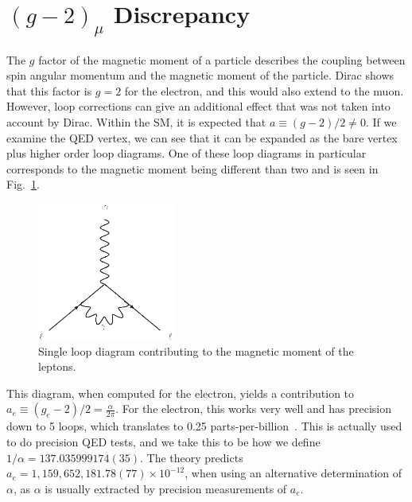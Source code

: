 \section{$(g-2)_\mu$ Discrepancy}
The $g$ factor of the magnetic moment of a particle describes the coupling between spin angular momentum and the magnetic moment of the particle.
Dirac shows that this factor is $g=2$ for the electron, and this would also extend to the muon.
However, loop corrections can give an additional effect that was not taken into account by Dirac.
Within the SM, it is expected that $a \equiv (g-2)/2 \neq 0$.
If we examine the QED vertex, we can see that it can be expanded as the bare vertex plus higher order loop diagrams.
One of these loop diagrams in particular corresponds to the magnetic moment being different than two and is seen in Fig.~\ref{fig:magnetic_moment}.

\begin{figure}[h]
    \centering
    \includegraphics[width=0.4\textwidth]{Figures/feynman_diagrams/muon_magnetic_moment}
    \caption{Single loop diagram contributing to the magnetic moment of the leptons.}
    \label{fig:magnetic_moment}
\end{figure}

This diagram, when computed for the electron, yields a contribution to $a_e \equiv (g_e - 2)/2 = \frac{\alpha}{2\pi}$.
For the electron, this works very well and has precision down to 5 loops, which translates to 0.25 parts-per-billion~\cite{Aoyama:2012wj}.
This is actually used to do precision QED tests, and we take this to be how we define $1/\alpha = 137.035999174(35)$.
The theory predicts $a_e = 1,159,652,181.78(77)\times 10^{-12}$, when using an alternative determination of $\alpha$, as $\alpha$ is usually extracted by precision measurements of $a_e$.

